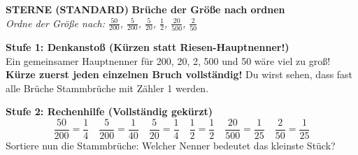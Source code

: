 \documentclass[a4paper,10pt]{article}
\newcommand{\mFrac}[2]{\frac{#1}{#2}}
\begin{document}
\begin{tcolorbox}[
    enhanced, colback=white, colframe=primaryBlue, arc=3mm, boxrule=1.2pt,
    left=4.5mm, right=4.5mm, top=2.5mm, bottom=2.5mm, height=12.9cm
]
    \begin{center}
        {\color{lvlBlue}\textbf{\faStar\faStar{} STERNE (STANDARD)}}\quad
        {\color{primaryBlue}\large\bfseries {}\quad Brüche der Größe nach ordnen}\\[1mm]
        {\footnotesize\textit{Ordne der Größe nach: $\mFrac{50}{200}$, $\mFrac{5}{200}$, $\mFrac{5}{20}$, $\mFrac{1}{2}$, $\mFrac{20}{500}$, $\mFrac{2}{50}$}}
    \end{center}
    \vspace{0.5mm}

    \begin{tcolorbox}[colback=step1Bg, colframe=step1Border, arc=2mm, boxrule=0.7pt, left=3mm, right=3mm, top=1.8mm, bottom=1.8mm]
        {\color{step1Text}\bfseries\faLightbulb\enskip Stufe 1: Denkanstoß (Kürzen statt Riesen-Hauptnenner!)}\\[0.8mm]
        {\small
        Ein gemeinsamer Hauptnenner für 200, 20, 2, 500 und 50 wäre viel zu groß!\\
        {\color{step1Text}\faHandPointRight}\enskip \textbf{Kürze zuerst jeden einzelnen Bruch vollständig!} Du wirst sehen, dass fast alle Brüche Stammbrüche mit Zähler 1 werden.
        }
    \end{tcolorbox}
    \vspace{0.8mm}

    \begin{tcolorbox}[colback=step2Bg, colframe=step2Border, arc=2mm, boxrule=0.7pt, left=3mm, right=3mm, top=1.8mm, bottom=1.8mm]
        {\color{step2Text}\bfseries\faSearch\enskip Stufe 2: Rechenhilfe (Vollständig gekürzt)}\\[0.8mm]
        {\small
        \[
            \mFrac{50}{200} = \mFrac{1}{4} \quad
            \mFrac{5}{200} = \mFrac{1}{40} \quad
            \mFrac{5}{20} = \mFrac{1}{4} \quad
            \mFrac{1}{2} = \mFrac{1}{2} \quad
            \mFrac{20}{500} = \mFrac{1}{25} \quad
            \mFrac{2}{50} = \mFrac{1}{25}
        \]
        Sortiere nun die Stammbrüche: Welcher Nenner bedeutet das kleinste Stück?
        }
    \end{tcolorbox}
    \vspace{0.8mm}


\end{tcolorbox}
\end{document}
